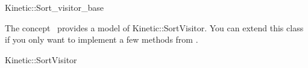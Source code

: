 
\begin{ccRefClass}{Kinetic::Sort_visitor_base}


\ccDefinition
  
The concept \ccRefName\ provides a model of
Kinetic::SortVisitor. You can extend this class if you only
want to implement a few methods from .

\ccIsModel

Kinetic::SortVisitor

\ccCreation
{}  %


\ccSeeAlso



\end{ccRefClass}


